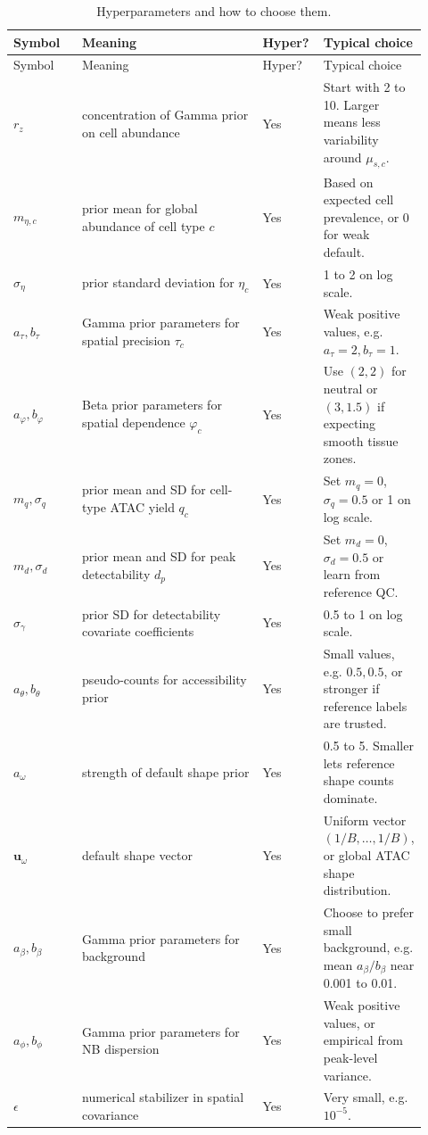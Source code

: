 \documentclass[11pt]{article}
\begin{document}
\begin{longtable}{L{0.16\linewidth}L{0.42\linewidth}C{0.12\linewidth}L{0.22\linewidth}}
\caption{Hyperparameters and how to choose them.}\label{tab:hyperparameters}\\
\toprule
Symbol & Meaning & Hyper? & Typical choice \\
\midrule
\endfirsthead
\toprule
Symbol & Meaning & Hyper? & Typical choice \\
\midrule
\endhead
\(r_z\) & concentration of Gamma prior on cell abundance & Yes & Start with 2 to 10. Larger means less variability around \(\mu_{s,c}\). \\
\(m_{\eta,c}\) & prior mean for global abundance of cell type \(c\) & Yes & Based on expected cell prevalence, or 0 for weak default. \\
\(\sigma_\eta\) & prior standard deviation for \(\eta_c\) & Yes & 1 to 2 on log scale. \\
\(a_{\tau},b_{\tau}\) & Gamma prior parameters for spatial precision \(\tau_c\) & Yes & Weak positive values, e.g. \(a_{\tau}=2,b_{\tau}=1\). \\
\(a_{\varphi},b_{\varphi}\) & Beta prior parameters for spatial dependence \(\varphi_c\) & Yes & Use \((2,2)\) for neutral or \((3,1.5)\) if expecting smooth tissue zones. \\
\(m_q,\sigma_q\) & prior mean and SD for cell-type ATAC yield \(q_c\) & Yes & Set \(m_q=0\), \(\sigma_q=0.5\) or 1 on log scale. \\
\(m_d,\sigma_d\) & prior mean and SD for peak detectability \(d_p\) & Yes & Set \(m_d=0\), \(\sigma_d=0.5\) or learn from reference QC. \\
\(\sigma_\gamma\) & prior SD for detectability covariate coefficients & Yes & 0.5 to 1 on log scale. \\
\(a_{\theta},b_{\theta}\) & pseudo-counts for accessibility prior & Yes & Small values, e.g. \(0.5,0.5\), or stronger if reference labels are trusted. \\
\(a_{\omega}\) & strength of default shape prior & Yes & 0.5 to 5. Smaller lets reference shape counts dominate. \\
\(\boldsymbol{u}_{\omega}\) & default shape vector & Yes & Uniform vector \((1/B,\ldots,1/B)\), or global ATAC shape distribution. \\
\(a_{\beta},b_{\beta}\) & Gamma prior parameters for background & Yes & Choose to prefer small background, e.g. mean \(a_{\beta}/b_{\beta}\) near 0.001 to 0.01. \\
\(a_{\phi},b_{\phi}\) & Gamma prior parameters for NB dispersion & Yes & Weak positive values, or empirical from peak-level variance. \\
\(\epsilon\) & numerical stabilizer in spatial covariance & Yes & Very small, e.g. \(10^{-5}\). \\
\bottomrule
\end{longtable}
\end{document}

